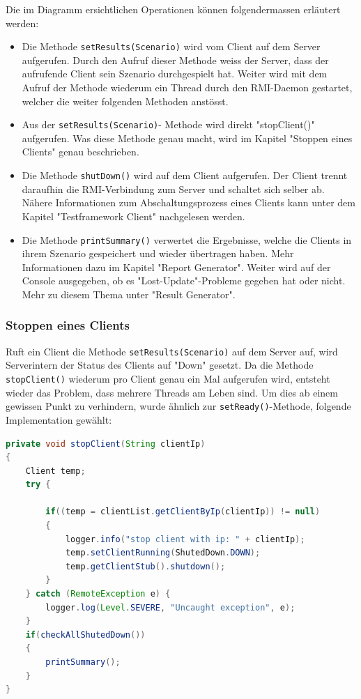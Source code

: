 Die im Diagramm ersichtlichen Operationen können folgender\-massen er\-läu\-tert werden:
\begin{itemize}
\item Die Methode \texttt{setResults(Scenario)} wird vom Client auf dem Server auf\-ge\-rufen. Durch den Aufruf dieser Methode weiss der Server, dass der aufrufende Client sein Szenario durchgespielt hat. Weiter wird mit dem Aufruf der Methode wiederum ein Thread durch den RMI-Daemon gestartet, welcher die weiter folgenden Methoden anstösst.
\item Aus der \texttt{setResults(Scenario)}- Methode wird di\-rekt "stopClient()" auf\-ge\-rufen. Was diese Methode genau macht, wird im Kapitel "Stoppen eines Clients" genau beschrieben.
\item Die Methode \texttt{shutDown()} wird auf dem Client aufgerufen. Der Client trennt daraufhin die RMI-Verbindung zum Server und schaltet sich selber ab. Nähere Informationen zum Abschaltungsprozess eines Clients kann unter dem Kapitel "Testframework Client" nachgelesen werden.
\item Die Methode \texttt{printSummary()} verwertet die Ergebnisse, welche die Clients in ihrem Szenario gespeichert und wieder übertragen haben. Mehr Informationen dazu im Kapitel "Report Generator". Weiter wird auf der Console ausgegeben, ob es "Lost-Update"-Probleme gegeben hat oder nicht. Mehr zu diesem Thema unter "Result Generator".
\end{itemize}

\subsubsection{Stoppen eines Clients}
\label{sec:stopClient}
Ruft ein Client die Methode \texttt{setResults(Scenario)} auf dem Server auf, wird Serverintern der Status des Clients auf "Down" gesetzt. Da die Methode \texttt{stopClient()} wiederum pro Client genau ein Mal aufgerufen wird, entsteht wieder das Problem, dass mehrere Threads am Leben sind. Um dies ab einem gewissen Punkt zu verhindern, wurde ähnlich zur \texttt{setReady()}-Methode, folgende Implementation gewählt:
\begin{lstlisting}[language=java, breaklines=true]
private void stopClient(String clientIp)
{
	Client temp;
	try {
		
		if((temp = clientList.getClientByIp(clientIp)) != null)
		{
			logger.info("stop client with ip: " + clientIp);
			temp.setClientRunning(ShutedDown.DOWN);
			temp.getClientStub().shutdown();
		}
	} catch (RemoteException e) {
		logger.log(Level.SEVERE, "Uncaught exception", e);
	}
	if(checkAllShutedDown())
	{
		printSummary();
	}
}
\end{lstlisting}

